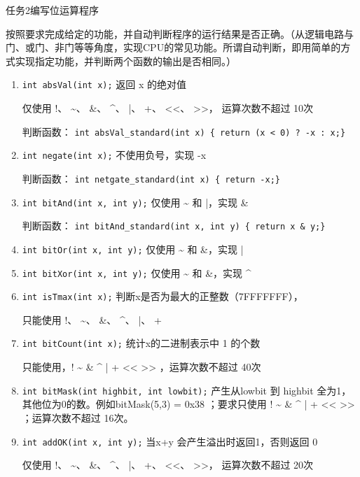 \documentclass[supercite]{Experimental_Report}
\theoremstyle{definition}
\begin{document}
任务2\quad 编写位运算程序

按照要求完成给定的功能，并自动判断程序的运行结果是否正确。（从逻辑电路与门、或门、非门等等角度，实现CPU的常见功能。所谓自动判断，即用简单的方式实现指定功能，并判断两个函数的输出是否相同。）

\begin{enumerate}
  \item \texttt{int absVal(int x);}      返回 x 的绝对值

仅使用 !、 \textasciitilde{}、 \&、 \^{}、 |、 +、 <<、 >>， 运算次数不超过 10次

判断函数： \texttt{int absVal\_standard(int x)  \{ return (x < 0) ? -x : x;\}}

  \item \texttt{int negate(int x);}      不使用负号，实现 -x

判断函数： \texttt{int netgate\_standard(int x)  \{ return -x;\}}

  \item \texttt{int bitAnd(int x, int y);}  仅使用 \textasciitilde{} 和 |，实现 \&

判断函数： \texttt{int bitAnd\_standard(int x, int y)  \{ return x \& y;\}}

  \item \texttt{int bitOr(int x, int y);}    仅使用 \textasciitilde{} 和 \&，实现 |

  \item \texttt{int bitXor(int x, int y);}   仅使用 \textasciitilde{} 和 \&，实现 \^{}

  \item \texttt{int isTmax(int x);}    判断x是否为最大的正整数（7FFFFFFF），

只能使用 !、 \textasciitilde{}、 \&、 \^{}、 |、 +

  \item \texttt{int bitCount(int x);}   统计x的二进制表示中 1 的个数

                  只能使用，! \textasciitilde{} \& \^{} | + << >> ，运算次数不超过 40次

  \item \texttt{int bitMask(int highbit, int lowbit);} 产生从lowbit 到 highbit 全为1，其他位为0的数。例如bitMask(5,3) = 0x38 ；要求只使用 ! \textasciitilde{} \& \^{} | + << >> ；运算次数不超过 16次。

  \item \texttt{int addOK(int x, int y);}  当x+y 会产生溢出时返回1，否则返回 0

仅使用 !、 \textasciitilde{}、 \&、 \^{}、 |、 +、 <<、 >>， 运算次数不超过 20次


\end{enumerate}
\end{document}
